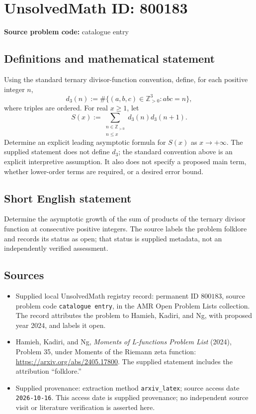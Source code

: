 \documentclass[11pt]{article}
\newcommand{\Z}{\mathbb{Z}}
\begin{document}
\section*{UnsolvedMath ID: 800183}
\textbf{Source problem code:} catalogue entry
\subsection{Definitions and mathematical statement}
Using the standard ternary divisor-function convention, define, for each positive integer \(n\),
\[
d_3(n):=\#\{(a,b,c)\in\Z_{>0}^{3}:abc=n\},
\]
where triples are ordered. For real \(x\geq 1\), let
\[
S(x):=\sum_{\substack{n\in\Z_{>0}\\n\leq x}}d_3(n)d_3(n+1).
\]
Determine an explicit leading asymptotic formula for \(S(x)\) as \(x\to+\infty\). The supplied statement does not define \(d_3\); the standard convention above is an explicit interpretive assumption. It also does not specify a proposed main term, whether lower-order terms are required, or a desired error bound.
\subsection{Short English statement}
Determine the asymptotic growth of the sum of products of the ternary divisor function at consecutive positive integers. The source labels the problem folklore and records its status as open; that status is supplied metadata, not an independently verified assessment.
\subsection{Sources}
\begin{itemize}
\item Supplied local UnsolvedMath registry record: permanent ID \(800183\), source problem code \texttt{catalogue entry}, in the AMR Open Problem Lists collection. The record attributes the problem to Hamieh, Kadiri, and Ng, with proposed year 2024, and labels it open.
\item Hamieh, Kadiri, and Ng, \emph{Moments of L-functions Problem List} (2024), Problem 35, under Moments of the Riemann zeta function: \url{https://arxiv.org/abs/2405.17800}. The supplied statement includes the attribution ``folklore.''
\item Supplied provenance: extraction method \texttt{arxiv\_latex}; source access date \texttt{2026-10-16}. This access date is supplied provenance; no independent source visit or literature verification is asserted here.
\end{itemize}
\end{document}
